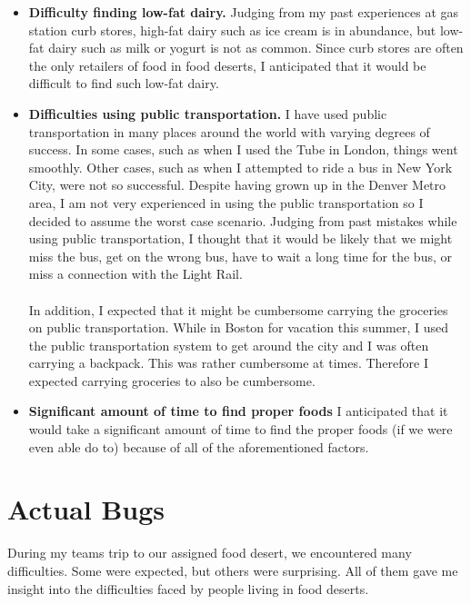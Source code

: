 \documentclass[11pt]{article}
\begin{document}
\begin{itemize}
    \item \textbf{Difficulty finding low-fat dairy.} Judging from my past experiences at gas station
        curb stores, high-fat dairy such as ice cream is in abundance, but low-fat dairy such as
        milk or yogurt is not as common. Since curb stores are often the only retailers of food in
        food deserts, I anticipated that it would be difficult to find such low-fat dairy.

    \item \textbf{Difficulties using public transportation.} I have used public transportation in
        many places around the world with varying degrees of success. In some cases, such as when I
        used the Tube in London, things went smoothly. Other cases, such as when I attempted to ride
        a bus in New York City, were not so successful. Despite having grown up in the Denver Metro
        area, I am not very experienced in using the public transportation so I decided to assume
        the worst case scenario. Judging from past mistakes while using public transportation, I
        thought that it would be likely that we might miss the bus, get on the wrong bus, have to
        wait a long time for the bus, or miss a connection with the Light Rail.\\
        \\
        In addition, I expected that it might be cumbersome carrying the groceries on public
        transportation. While in Boston for vacation this summer, I used the public transportation
        system to get around the city and I was often carrying a backpack. This was rather
        cumbersome at times. Therefore I expected carrying groceries to also be cumbersome.

    \item \textbf{Significant amount of time to find proper foods} I anticipated that it would take
        a significant amount of time to find the proper foods (if we were even able do to) because
        of all of the aforementioned factors.
\end{itemize}

\section{Actual Bugs}
During my teams trip to our assigned food desert, we encountered many difficulties. Some were
expected, but others were surprising. All of them gave me insight into the difficulties faced by
people living in food deserts.
\end{document}
